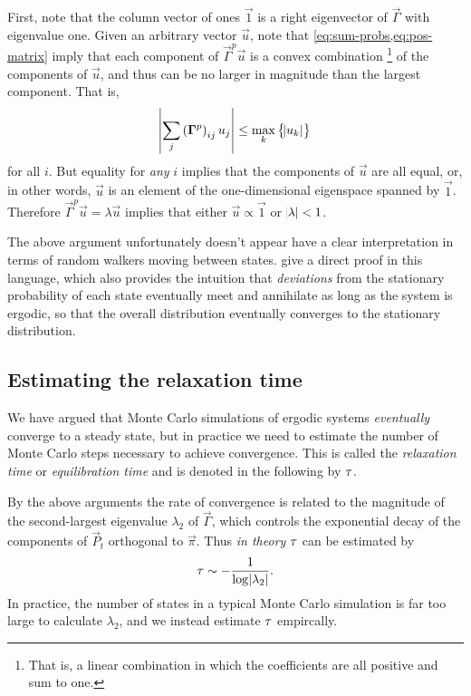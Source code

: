 First, note that the column vector of ones $\vec{1}$ is a right eigenvector of
$\vec{\Gamma}$ with eigenvalue one. Given an arbitrary vector $\vec{u}$, note
that \cref{eq:sum-probs,eq:pos-matrix} imply that each component of
$\vec{\Gamma}^p \vec{u}$ is a convex combination%
\footnote{%
  That is, a linear combination in which the coefficients are all positive and
  sum to one.
}
of the components of $\vec{u}$, and thus can be no larger in magnitude than the
largest component. That is,
\begin{equation}
  \abs{\sum_j \del{\vec{\Gamma}^p}_{ij} u_j}
  \leq \max_k \cbr{\abs{u_k}}
\end{equation}
for all $i$. But equality for \emph{any} $i$ implies that the components of
$\vec{u}$ are all equal, or, in other words, $\vec{u}$ is an element of the
one-dimensional eigenspace spanned by $\vec{1}$. Therefore
$\vec{\Gamma}^p \vec{u} = \lambda\vec{u}$ implies that either $\vec{u} \propto \vec{1}$
or $\abs{\lambda}<1$.

The above argument unfortunately doesn't appear have a clear interpretation in
terms of random walkers moving between states.
\textcite{narayan2001convergence} give a direct proof in this language, which
also provides the intuition that \emph{deviations} from the stationary
probability of each state eventually meet and annihilate as long as the system
is ergodic, so that the overall distribution eventually converges to the
stationary distribution.

\subsection{Estimating the relaxation time}
\label{sec:numerical-equilibration}

We have argued that Monte Carlo simulations of ergodic systems
\emph{eventually} converge to a steady state, but in practice we need to
estimate the number of Monte Carlo steps necessary to achieve convergence. This
is called the \emph{relaxation time} or \emph{equilibration time} and is
denoted in the following by $\tau$.

By the above arguments the rate of convergence is related to the magnitude of
the second-largest eigenvalue $\lambda_2$ of $\vec{\Gamma}$, which controls the
exponential decay of the components of $\vec{P}_t$ orthogonal to $\vec{\pi}$.
Thus \emph{in theory} $\tau$ can be estimated by
\begin{equation}
  \tau \sim -\frac{1}{\log{\abs{\lambda_2}}}.
\end{equation}
In practice, the number of states in a typical Monte Carlo simulation is far
too large to calculate $\lambda_2$, and we instead estimate $\tau$ empircally.

